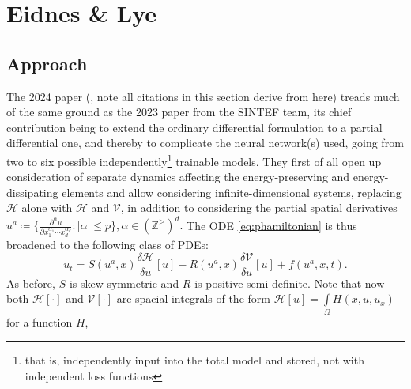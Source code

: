 \documentclass[10 pt, a4paper]{article}
\begin{document}
\section{Eidnes \& Lye}
\subsection{Approach}
The 2024 paper (\cite{phnn4pde}, note all citations in this section derive from here) treads much of the same ground as the 2023 paper from the SINTEF team, its chief contribution being to extend the ordinary differential formulation to a partial differential one, and thereby to complicate the neural network(s) used, going from two to six possible independently\footnote{that is, independently input into the total model and stored, not with independent loss functions} trainable models. They first of all open up consideration of separate dynamics affecting the energy-preserving and energy-dissipating elements and allow considering infinite-dimensional systems, replacing $\mathcal{H}$ alone with $\mathcal{H}$ and $\mathcal{V}$, in addition to considering the partial spatial derivatives \(u^a \coloneqq \bigg\{ \frac{\partial^\alpha u}{\partial x_1^{\alpha_1}\cdots x_d^{\alpha_d}}\colon|\alpha|\leq p \bigg\}, \alpha\in(\mathbb{Z}^\geq)^d.\) The ODE \eqref{eq:phamiltonian} is thus broadened to the following class of PDEs: 
\begin{equation*}
	u_t = S(u^a, x)\frac{\delta\mathcal{H}}{\delta u}[u]-R(u^a, x)\frac{\delta \mathcal{V}}{\delta u}[u] + f(u^a,x,t).
\end{equation*}
As before, $S$ is skew-symmetric and $R$ is positive semi-definite. Note that now both $\mathcal{H}[\cdot]$ and $\mathcal{V}[\cdot]$ are spacial integrals of the form \(\mathcal{H}[u]=\int\limits_\Omega H(x,u,u_x)\) for a function $H$, 
\begin{comment}
	the derivative of which is defined by the property \(\left\langle\frac{\delta\mathcal{H}}{\delta u}[u],v\right\rangle_{L_2} = \frac{d}{d\varepsilon}\bigg\vert_{\varepsilon=0} \mathcal{H}[u + \varepsilon v] \quad \forall v\in H^p(\Omega)\), and 
\end{comment}
\end{document}
